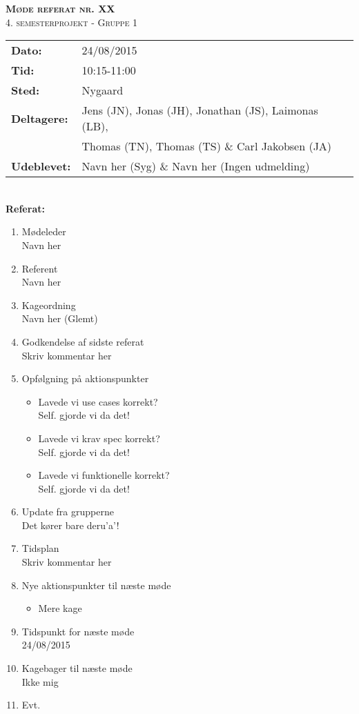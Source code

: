 
\newcommand{\HRule}{\rule{\linewidth}{0.1mm}}


	\begin{center}
		{\huge \bfseries \textsc{Møde referat nr. XX}}\\
		\textsc{\large 4. semesterprojekt - Gruppe 1}\\[0.3cm]
	\end{center}
	\begin{tabular}{ll}
	\large \textbf{Dato:} & 24/08/2015  \\ %
	\large \textbf{Tid:}  & 10:15-11:00 \\ %
	\large \textbf{Sted:} & Nygaard		\\ %
	\large \textbf{Deltagere:} & Jens (JN), Jonas (JH), Jonathan (JS), Laimonas (LB), \\
	\large \textbf & Thomas (TN),  Thomas (TS) \& Carl Jakobsen (JA)\\
	\large \textbf{Udeblevet:} & Navn her (Syg) \& Navn her (Ingen udmelding)	\\
	\end{tabular}\\
	\phantom{\,}\hspace{0.1em} \large \textbf{Referat:}
	\begin{enumerate}
		\itemsep 0.3em 
		\item Mødeleder\\
			Navn her
		\item Referent\\
			Navn her
		\item Kageordning\\
			Navn her (Glemt)
		\item Godkendelse af sidste referat\\
			Skriv kommentar her
		\item Opfølgning på aktionspunkter
		\begin{itemize}
			\itemsep 0.3em 
			\item Lavede vi use cases korrekt?\\
				Self. gjorde vi da det!
			\item Lavede vi krav spec korrekt?\\
				Self. gjorde vi da det!
			\item Lavede vi funktionelle korrekt?\\
				Self. gjorde vi da det!
		\end{itemize}
		\item Update fra grupperne\\
			Det kører bare deru'a'!
		\item Tidsplan\\
			Skriv kommentar her
		\item Nye aktionspunkter til næste møde
		\begin{itemize}
			\itemsep 0.3em 
			\item Mere kage
		\end{itemize}
		\item Tidspunkt for næste møde\\
			24/08/2015
		\item Kagebager til næste møde\\
			Ikke mig
		\item Evt.
	\end{enumerate}
